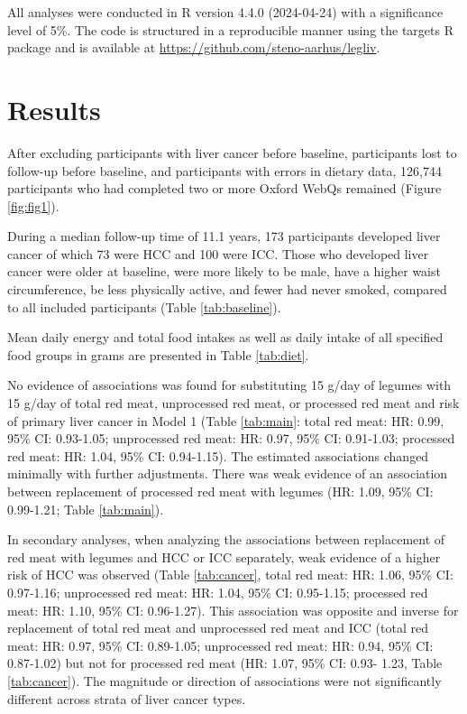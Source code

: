 \documentclass[
]{article}
\begin{document}
All analyses were conducted in R version 4.4.0 (2024-04-24) with a
significance level of 5\%. The code is structured in a reproducible
manner using the targets R package \autocite{landau2021} and is available at
\url{https://github.com/steno-aarhus/legliv}.

\hypertarget{sec3}{%
\section{Results}\label{sec3}}

After excluding participants with liver cancer before baseline,
participants lost to follow-up before baseline, and participants with
errors in dietary data, 126,744 participants who had completed two or
more Oxford WebQs remained (Figure \ref{fig:fig1}).

During a median follow-up time of 11.1 years, 173 participants developed
liver cancer of which 73 were HCC and 100 were ICC. Those who developed
liver cancer were older at baseline, were more likely to be male, have a
higher waist circumference, be less physically active, and fewer had
never smoked, compared to all included participants (Table
\ref{tab:baseline}).

\noindent Mean daily energy and total food intakes as well as daily
intake of all specified food groups in grams are presented in Table
\ref{tab:diet}.

No evidence of associations was found for substituting 15 g/day of
legumes with 15 g/day of total red meat, unprocessed red meat, or
processed red meat and risk of primary liver cancer in Model 1 (Table
\ref{tab:main}: total red meat:
HR: 0.99, 95\% CI: 0.93-1.05;
unprocessed red meat:
HR: 0.97, 95\% CI: 0.91-1.03;
processed red meat:
HR: 1.04, 95\% CI: 0.94-1.15).
The estimated associations changed minimally with further adjustments.
There was weak evidence of an association between replacement of
processed red meat with legumes
(HR: 1.09, 95\% CI: 0.99-1.21;
Table \ref{tab:main}).

In secondary analyses, when analyzing the associations between
replacement of red meat with legumes and HCC or ICC separately, weak
evidence of a higher risk of HCC was observed (Table \ref{tab:cancer},
total red meat:
HR: 1.06, 95\% CI: 0.97-1.16;
unprocessed red meat:
HR: 1.04, 95\% CI: 0.95-1.15;
processed red meat:
HR: 1.10, 95\% CI: 0.96-1.27).
This association was opposite and inverse for replacement of total red
meat and unprocessed red meat and ICC (total red meat:
HR: 0.97, 95\% CI: 0.89-1.05;
unprocessed red meat:
HR: 0.94, 95\% CI: 0.87-1.02)
but not for processed red meat
(HR: 1.07, 95\% CI: 0.93- 1.23,
Table \ref{tab:cancer}). The magnitude or direction of associations
were not significantly different across strata of liver cancer types.
\end{document}
